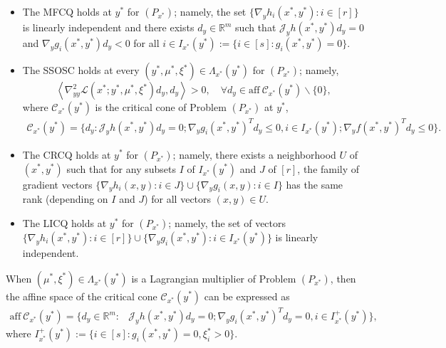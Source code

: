 \documentclass[11pt]{article}
\theoremstyle{definition}
\theoremstyle{remark}
\numberwithin{equation}{section}
\begin{document}
\begin{itemize}
 \item[(A1)] The MFCQ holds at $y^*$ for $(P_{x^*})$; namely, the set $\{\nabla_y h_i(x^*, y^*): i\in [r]\}$ is linearly independent and there exists $d_y\in \mathbb{R}^m$ such that $\mathcal{J}_y h(x^*,y^*)d_y=0$ and $\nabla_y g_i(x^*,y^*)d_y< 0$ for all
      $i\in I_{x^*}(y^*):=\{i\in[s]:g_i(x^*,y^*)=0\}.$
  \item[(A2)] The SSOSC holds at every $(y^*, \mu^*,\xi^*)\in \Lambda_{x^*}(y^*)$ for $(P_{x^*})$; namely,
$$
\left\langle\nabla_{y y}^2 \mathcal{L}\left(x^*; y^*, \mu^*,\xi^*\right) d_y, d_y\right\rangle>0, \quad \forall
d_y \in  \text{aff}~ \mathcal{C}_{x^*}(y^*)\backslash\{0\}, $$
where  $\mathcal{C}_{x^*}(y^*)$ is the critical cone of Problem $(P_{x^*})$ at $y^*$,
\begin{align*}
  \mathcal{C}_{x^*}(y^*)=\{d_y :  \mathcal{J}_y h(x^*, y^*)d_y=0;\nabla_y g_i(x^*,y^*)^Td_y\le 0,i\in I_{x^*}(y^*);
 \nabla_y f(x^*,y^*)^Td_y\le 0 \}.
\end{align*}
\item[(A3)] The CRCQ holds at $y^*$ for $(P_{x^*})$; namely, there exists a neighborhood $U$ of $(x^*,y^*)$ such that for any subsets $I$ of $I_{x^*}(y^*)$ and $J$ of $[r]$, the family of gradient vectors $\{\nabla_y h_i(x, y): i\in J\}\cup\{\nabla_y g_i(x, y):i\in I\}$ has the same rank (depending on $I$ and $J$) for all vectors $(x,y)\in U$.
  \item[(A4)] The LICQ %
 holds at $y^*$ for $(P_{x^*})$; namely, the set of vectors
$
\{\nabla_y h_i(x^*, y^*): i\in [r]\}\cup\{\nabla_y g_i(x^*, y^*):i\in
I_{x^*}(y^*)\}
$
is linearly independent.
\end{itemize}

When $(\mu^*,\xi^*)\in \Lambda_{x^*}(y^*)$ is a Lagrangian multiplier of Problem $(P_{x^*})$, then
 the affine space of the critical cone $\mathcal{C}_{x^*}(y^*)$ can be expressed as
\begin{align*}
 \text{aff}~ \mathcal{C}_{x^*}(y^*)=\{d_y\in \mathbb{R}^m: &\mathcal{J}_y h(x^*, y^*)d_y=0;\nabla_y
 g_i(x^*,y^*)^Td_y= 0,i\in I_{x^*}^{+}(y^*) \},
\end{align*}
where $I_{x^*}^{+}(y^*):=\{i\in[s]:g_i(x^*,y^*)=0, \xi_{i}^*>0\}$.
\end{document}

